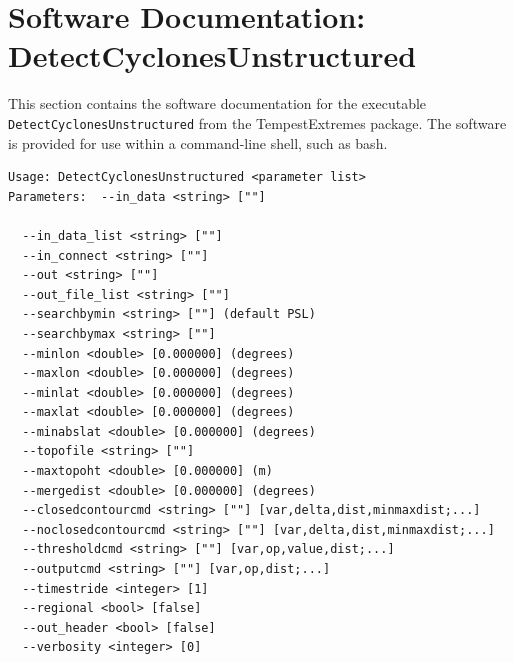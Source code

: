 \documentclass[gmdd, hvmath]{copernicus}
\begin{document}


\section{Software Documentation: DetectCyclonesUnstructured} \label{sec:DetectCyclonesUnstructuredAppendix}

This section contains the software documentation for the executable \texttt{DetectCyclonesUnstructured} from the TempestExtremes package.  The software is provided for use within a command-line shell, such as bash.

{\small
\begin{verbatim}
Usage: DetectCyclonesUnstructured <parameter list>
Parameters:  --in_data <string> [""] 

  --in_data_list <string> [""]
  --in_connect <string> [""] 
  --out <string> [""] 
  --out_file_list <string> [""]
  --searchbymin <string> [""] (default PSL)
  --searchbymax <string> [""] 
  --minlon <double> [0.000000] (degrees)
  --maxlon <double> [0.000000] (degrees)
  --minlat <double> [0.000000] (degrees)
  --maxlat <double> [0.000000] (degrees)
  --minabslat <double> [0.000000] (degrees)
  --topofile <string> [""] 
  --maxtopoht <double> [0.000000] (m)
  --mergedist <double> [0.000000] (degrees)
  --closedcontourcmd <string> [""] [var,delta,dist,minmaxdist;...]
  --noclosedcontourcmd <string> [""] [var,delta,dist,minmaxdist;...]
  --thresholdcmd <string> [""] [var,op,value,dist;...]
  --outputcmd <string> [""] [var,op,dist;...]
  --timestride <integer> [1] 
  --regional <bool> [false] 
  --out_header <bool> [false] 
  --verbosity <integer> [0] 
\end{verbatim}
}
\end{document}
